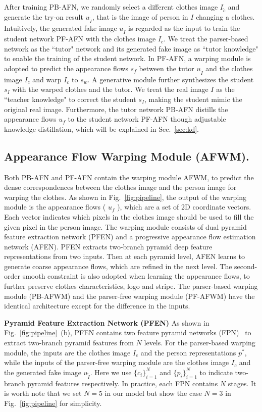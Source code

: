 \documentclass[final]{cvpr}
\begin{document}
After training PB-AFN, we randomly select a different clothes image $I_{\widetilde{c}}$ and generate the try-on result ${u}_{\widetilde{I}}$, that is the image of person in $I$ changing a clothes.
Intuitively, the generated fake image ${u}_{\widetilde{I}}$ is regarded as the input to train the student network PF-AFN with the clothes image $I_c$.
We treat the parser-based network as the ``tutor" network and its generated fake image as ``tutor knowledge" to enable the training of the student network.
In PF-AFN, a warping module is adopted to predict the appearance flows ${s}_f$ between the tutor ${u}_{\widetilde{I}}$ and the clothes image $I_c$ and warp $I_c$ to ${s}_w$.
A generative module further synthesizes the student ${s}_I$ with the warped clothes and the tutor.
We treat the real image $I$ as the ``teacher knowledge" to correct the student ${s}_I$, making the student mimic the original real image.
Furthermore, the tutor network PB-AFN distills the appearance flows ${u}_f$ to the student network PF-AFN though adjustable knowledge distillation, which will be explained in Sec.~\ref{sec:kd}.	
	
	
	\subsection{Appearance Flow Warping Module (AFWM).} \label{sec:flow}
Both PB-AFN and PF-AFN contain the warping module AFWM, to predict the dense correspondences between the clothes image and the person image for warping the clothes.
As shown in Fig.~\ref{fig:pipeline}, the output of the warping module is the appearance flows ( \eg ${u}_f$ ), which are a set of 2D coordinate vectors.
Each vector indicates which pixels in the clothes image should be used to fill the given pixel in the person image.
The warping module consists of dual pyramid feature extraction network (PFEN) and a progressive appearance flow estimation network (AFEN).
PFEN extracts two-branch pyramid deep feature representations from two inputs.
Then at each pyramid level, AFEN learns to generate coarse appearance flows, which are refined in the next level. 
The second-order smooth constraint is also adopted when learning the appearance flows, to further preserve clothes characteristics, \eg logo and stripe.
The parser-based warping module (PB-AFWM) and the parser-free warping module (PF-AFWM) have the identical architecture except for the difference in the inputs.
	
	\textbf{Pyramid Feature Extraction Network (PFEN)}
As shown in Fig.~\ref{fig:pipeline}~(b), PFEN contains two feature pyramid networks (FPN)~\cite{fpn} to extract two-branch pyramid features from $N$ levels.
For the parser-based warping module, the inputs are the clothes image $I_c$ and the person representations $p^*$, while the inputs of the parser-free warping module are the clothes image $I_c$ and the generated fake image ${u}_{\widetilde{I}}$.
Here we use $\{c_i\}_{i=1}^N$ and $\{p_i\}_{i=1}^N$ to indicate two-branch pyramid features respectively.
In practice, each FPN contains $N$ stages. It is worth note that we set $N=5$ in our model but show the case $N=3$ in Fig.~\ref{fig:pipeline} for simplicity.
	
\end{document}
